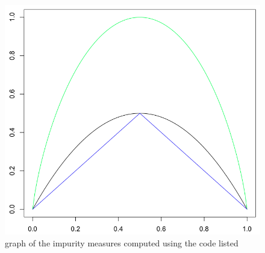\documentclass[11pt]{article}
\begin{document}
\begin{enumerate}
\begin{figure}[H]
\begin{center}
\includegraphics[scale=0.3]{graphsoferrormeasures}
\end{center}
\caption{graph of the impurity measures computed using the code listed}
\end{figure}


\end{enumerate}
\end{document}
